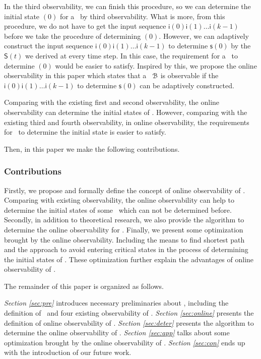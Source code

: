 In the third observability, we can finish this procedure, so we can determine the initial state \State$(0)$ for a \BCN\ by third observability. What is more, from this procedure, we do not have to get the input sequence $\mathsf{i}(0)\mathsf{i}(1)\ldots\mathsf{i}(k-1)$ before we take the procedure of determining \State$(0)$. However, we can adaptively construct the input sequence $\mathsf{i}(0)\mathsf{i}(1)\ldots\mathsf{i}(k-1)$ to determine $\mathsf{s}(0)$ by the $\mathsf{S}(t)$ we derived at every time step. In this case, the requirement for a \BCN\ to determine \State$(0)$ would be easier to satisfy. Inspired by this, we propose the online observability in this paper which states that a \BCN\ ${\mathcal{B}}$ is observable if the $\mathsf{i}(0)\mathsf{i}(1)\ldots\mathsf{i}(k-1)$ to determine $\mathsf{s}(0)$ can be adaptively constructed. 

Comparing with the existing first and second observability, the online observability can determine the initial states of \BCNs. However, comparing with the existing third and fourth observability, in online observability, the requirements for \BCNs\ to determine the initial state is easier to satisfy.  

Then, in this paper we make the following contributions. 
\subsubsection*{Contributions}
Firstly, we propose and formally define the concept of online observability of \BCNs. Comparing with existing observability, the online observability can help to determine the initial states of some \BCNs\ which can not be determined before. Secondly, in addition to theoretical research, we also provide the algorithm to determine the online observability for \BCNs. Finally, we present some optimization brought by the online observability. Including the means to find shortest path and the approach to avoid entering critical states in the process of determining the initial states of \BCNs.  These optimization further explain the advantages of online observability of \BCNs. 

The remainder of this paper is organized as follows.

 {\em Section \ref{sec:pre}} introduces necessary preliminaries about \BCNs, including the definition of \BCNs\ and four existing observability of \BCNs. {\em Section \ref{sec:online}} presents the definition of online observability of \BCNs. {\em Section \ref{sec:deter}} presents the algorithm to determine the online observability of \BCNs. {\em Section \ref{sec:app}} talks about some optimization brought by the online observability of \BCNs. {\em Section \ref{sec:con}} ends up with the introduction of our future work.

